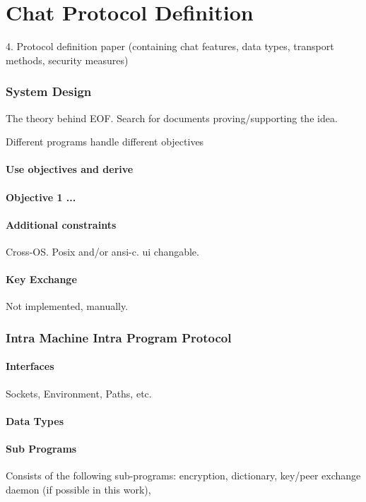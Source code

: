 \chapter{Chat Protocol Definition}
    4. Protocol definition paper (containing chat features,
            data types, transport methods, security measures)

\subsection{System Design}
The theory behind EOF.
Search for documents proving/supporting the idea.

Different programs handle different objectives
\subsubsection{Use objectives and derive}
\subsubsection{Objective 1 ...}
\subsubsection{Additional constraints}
Cross-OS. Posix and/or ansi-c. ui changable.
\subsubsection{Key Exchange}
Not implemented, manually.
\subsection{Intra Machine Intra Program Protocol}
\subsubsection{Interfaces}
Sockets, Environment, Paths, etc.
\subsubsection{Data Types}
\subsubsection{Sub Programs}
Consists of the following sub-programs:
encryption, dictionary, key/peer exchange daemon (if possible in this work),
